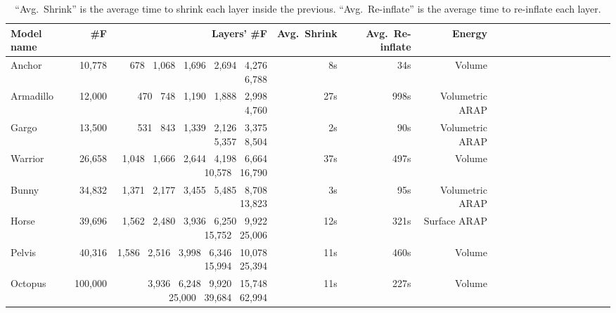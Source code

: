\begin{table*}
\centering
{}
\setlength{\tabcolsep}{5.5pt}
\begin{tabular}{l r r r r r r r r r r r r r r r r r}
\rowcolor{white}
Model name  & \#F & Layers' \#F & Avg.\ Shrink & Avg.\ Re-inflate& Energy\\
\midrule
Anchor & 10,778 & 678 \ 1,068 \ 1,696 \ 2,694 \ 4,276 \ 6,788 & 8s & 34s & Volume \\
Armadillo & 12,000 & 470 \ 748 \ 1,190 \ 1,888 \ 2,998 \ 4,760 & 27s & 998s & Volumetric ARAP \\
Gargo & 13,500 & 531 \ 843 \ 1,339 \ 2,126 \ 3,375 \ 5,357 \ 8,504 & 2s & 90s & Volumetric ARAP\\
Warrior & 26,658 & 1,048 \ 1,666 \ 2,644 \ 4,198 \ 6,664 \ 10,578 \ 16,790 & 37s & 497s & Volume  \\
Bunny & 34,832 & 1,371 \ 2,177 \ 3,455 \ 5,485 \ 8,708 \ 13,823 & 3s & 95s & Volumetric ARAP \\
Horse & 39,696 & 1,562 \ 2,480 \ 3,936 \ 6,250 \ 9,922 \ 15,752 \ 25,006 & 12s & 321s & Surface ARAP \\
Pelvis & 40,316 & 1,586 \ 2,516 \ 3,998 \ 6,346 \ 10,078 \ 15,994 \ 25,394 & 11s & 460s & Volume  \\
Octopus & 100,000 & 3,936 \ 6,248 \ 9,920 \ 15,748 \ 25,000 \ 39,684 \ 62,994 & 11s & 227s & Volume \\
\bottomrule
\end{tabular}
\caption{
``Avg.\ Shrink'' is the average time to shrink each layer inside the previous.
``Avg.\ Re-inflate'' is the average time to re-inflate each layer.
 
}
\label{tab:timings}
\end{table*}
